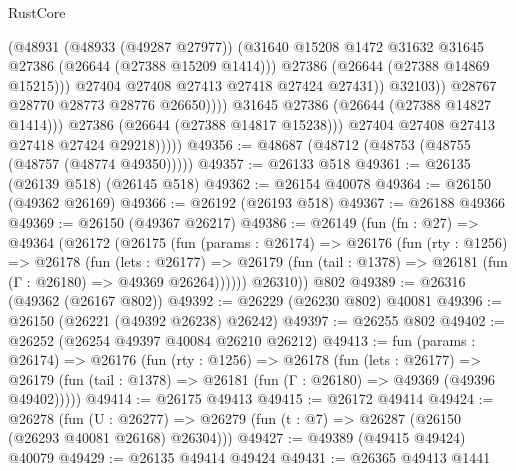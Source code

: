 \begin{lexlean}{RustCore}
\begin{coremodule}
                                  (@48931
                                    (@48933 (@49287 @27977))
                                    (@31640
                                      @15208
                                      @1472
                                      @31632
                                      @31645
                                      @27386
                                      (@26644 (@27388 @15209 @1414)))
                                    @27386
                                    (@26644 (@27388 @14869 @15215)))
                                  @27404
                                  @27408
                                  @27413
                                  @27418
                                  @27424
                                  @27431))
                              @32103))
                          @28767
                          @28770
                          @28773
                          @28776
                          @26650))))
                  @31645
                  @27386
                  (@26644 (@27388 @14827 @1414)))
                @27386
                (@26644 (@27388 @14817 @15238)))
              @27404
              @27408
              @27413
              @27418
              @27424
              @29218)))))
@49356 := @48687 (@48712 (@48753 (@48755 (@48757 (@48774 @49350)))))
@49357 := @26133 @518
@49361 := @26135 (@26139 @518) (@26145 @518)
@49362 := @26154 @40078
@49364 := @26150 (@49362 @26169)
@49366 := @26192 (@26193 @518)
@49367 := @26188 @49366
@49369 := @26150 (@49367 @26217)
@49386 := @26149
    (fun (fn : @27) =>
    @49364
      (@26172
        (@26175
          (fun (params : @26174) =>
          @26176
            (fun (rty : @1256) =>
            @26178
              (fun (lets : @26177) =>
              @26179 (fun (tail : @1378) => @26181 (fun (Γ : @26180) => @49369 @26264))))))
        @26310))
    @802
@49389 := @26316 (@49362 (@26167 @802))
@49392 := @26229 (@26230 @802) @40081
@49396 := @26150 (@26221 (@49392 @26238) @26242)
@49397 := @26255 @802
@49402 := @26252 (@26254 @49397 @40084 @26210 @26212)
@49413 := fun (params : @26174) =>
  @26176
    (fun (rty : @1256) =>
    @26178
      (fun (lets : @26177) =>
      @26179 (fun (tail : @1378) => @26181 (fun (Γ : @26180) => @49369 (@49396 @49402)))))
@49414 := @26175 @49413
@49415 := @26172 @49414
@49424 := @26278
    (fun (U : @26277) => @26279 (fun (t : @7) => @26287 (@26150 (@26293 @40081 @26168) @26304)))
@49427 := @49389 (@49415 @49424) @40079
@49429 := @26135 @49414 @49424
@49431 := @26365 @49413 @1441

\end{coremodule}
\end{lexlean}
